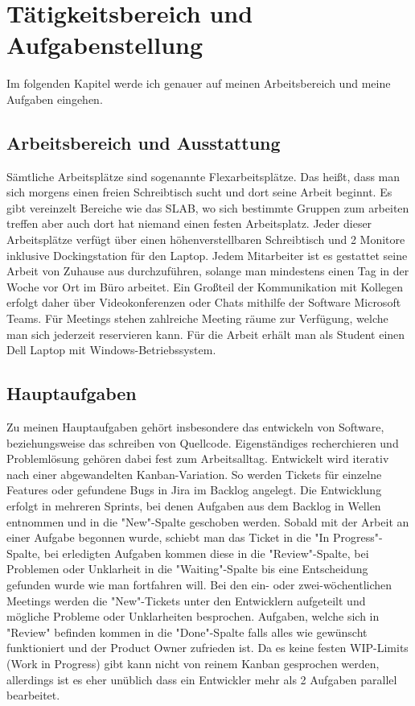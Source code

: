 \chapter{Tätigkeitsbereich und Aufgabenstellung}
Im folgenden Kapitel werde ich genauer auf meinen Arbeitsbereich und meine Aufgaben eingehen.

\section{Arbeitsbereich und Ausstattung}
Sämtliche Arbeitsplätze sind sogenannte Flexarbeitsplätze. Das heißt, dass man sich morgens einen freien Schreibtisch sucht und dort seine Arbeit beginnt. 
Es gibt vereinzelt Bereiche wie das SLAB, wo sich bestimmte Gruppen zum arbeiten treffen aber auch dort hat niemand einen festen Arbeitsplatz. 
Jeder dieser Arbeitsplätze verfügt über einen höhenverstellbaren Schreibtisch und 2 Monitore inklusive Dockingstation für den Laptop. 
Jedem Mitarbeiter ist es gestattet seine Arbeit von Zuhause aus durchzuführen, solange man mindestens einen Tag in der Woche vor Ort im Büro arbeitet. 
Ein Großteil der Kommunikation mit Kollegen erfolgt daher über Videokonferenzen oder Chats mithilfe der Software Microsoft Teams. 
Für Meetings stehen zahlreiche Meeting räume zur Verfügung, welche man sich jederzeit reservieren kann.
Für die Arbeit erhält man als Student einen Dell Laptop mit Windows-Betriebssystem. 


\section{Hauptaufgaben}
Zu meinen Hauptaufgaben gehört insbesondere das entwickeln von Software, beziehungsweise das schreiben von Quellcode. Eigenständiges recherchieren und Problemlösung gehören dabei fest zum Arbeitsalltag.
Entwickelt wird iterativ nach einer abgewandelten Kanban-Variation. So werden Tickets für einzelne Features oder gefundene Bugs in Jira im Backlog angelegt. Die Entwicklung erfolgt in mehreren Sprints,
bei denen Aufgaben aus dem Backlog in Wellen entnommen und in die "New"-Spalte geschoben werden. Sobald mit der Arbeit an einer Aufgabe begonnen wurde, schiebt man das Ticket in die "In Progress"-Spalte, 
bei erledigten Aufgaben kommen diese in die "Review"-Spalte, bei Problemen oder Unklarheit in die "Waiting"-Spalte bis eine Entscheidung gefunden wurde wie man fortfahren will.
Bei den ein- oder zwei-wöchentlichen Meetings werden die "New"-Tickets unter den Entwicklern aufgeteilt und mögliche Probleme oder Unklarheiten besprochen. Aufgaben, welche sich in "Review" befinden 
kommen in die "Done"-Spalte falls alles wie gewünscht funktioniert und der Product Owner zufrieden ist. Da es keine festen WIP-Limits (Work in Progress) gibt kann nicht von reinem Kanban gesprochen werden, 
allerdings ist es eher unüblich dass ein Entwickler mehr als 2 Aufgaben parallel bearbeitet.


